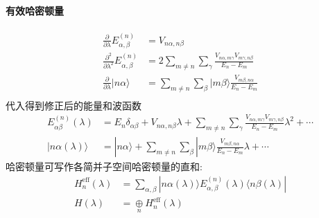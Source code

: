 \documentclass[../../main.tex]{subfiles}
\begin{document}
\paragraph{有效哈密顿量}
\begin{align*}
    \frac{\partial}{\partial\lambda}E^{(n)}_{\alpha,\beta} &= V_{n\alpha,n\beta}\\
    \frac{\partial^{2}}{\partial\lambda^{2}}E^{(n)}_{\alpha,\beta} &= 2\sum_{m\neq n}\sum_{\gamma}\frac{V_{n\alpha,m\gamma}V_{m\gamma,n\beta}}{E_{n}-E_{m}}\\
    \frac{\partial}{\partial\lambda}|n\alpha\rangle &= \sum_{m\neq n}\sum_{\beta}|m\beta\rangle \frac{V_{m\beta,n\alpha}}{E_{n}-E_{m}}\\
\end{align*}
代入得到修正后的能量和波函数
\begin{align*}
    E^{(n)}_{\alpha\beta}(\lambda) &= E_{n}\delta_{\alpha\beta} + V_{n\alpha,n\beta}\lambda + \sum_{m\neq n}\sum_{\gamma}\frac{V_{n\alpha,m\gamma}V_{m\gamma,n\beta}}{E_{n}-E_{m}}\lambda^{2} + \cdots\\
    |n\alpha(\lambda)\rangle &= |n\alpha\rangle + \sum_{m\neq n}\sum_{\beta}|m\beta\rangle\frac{V_{m\beta,n\alpha}}{E_{n}-E_{m}}\lambda + \cdots
\end{align*}
哈密顿量可写作各简并子空间哈密顿量的直和:
\begin{align*}
    H_{n}^{\text{eff}}(\lambda) &= \sum_{\alpha,\beta}|n\alpha(\lambda)\rangle E^{(n)}_{\alpha,\beta}(\lambda)\langle n\beta(\lambda)|\\
    H(\lambda) &= \underset{n}{\oplus}H_{n}^{\text{eff}}(\lambda)
\end{align*}
\end{document}
